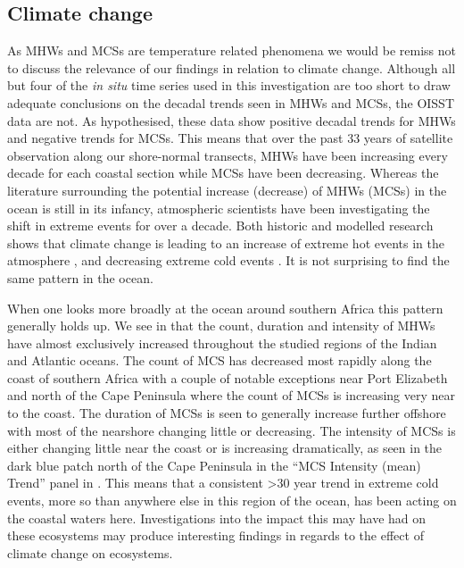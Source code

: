 \documentclass[a4paper,10pt,review]{elsarticle}
\begin{document}
\subsection{Climate change}
As MHWs and MCSs are temperature related phenomena we would be remiss not to discuss the relevance of our findings in relation to climate change. Although all but four of the \emph{in situ} time series used in this investigation are too short to draw adequate conclusions on the decadal trends seen in MHWs and MCSs, the OISST data are not. As hypothesised, these data show positive decadal trends for MHWs and negative trends for MCSs. This means that over the past 33 years of satellite observation along our shore-normal transects, MHWs have been increasing every decade for each coastal section while MCSs have been decreasing. Whereas the literature surrounding the potential increase (decrease) of MHWs (MCSs) in the ocean is still in its infancy, atmospheric scientists have been investigating the shift in extreme events for over a decade. Both historic and modelled research shows that climate change is leading to an increase of extreme hot events in the atmosphere \citep{Easterling2000, Perkins2013}, and decreasing extreme cold events \citep{Meehl2004}. It is not surprising to find the same pattern in the ocean.

When one looks more broadly at the ocean around southern Africa this pattern generally holds up. We see in  that the count, duration and intensity of MHWs have almost exclusively increased throughout the studied regions of the Indian and Atlantic oceans. The count of MCS has decreased most rapidly along the coast of southern Africa with a couple of notable exceptions near Port Elizabeth and north of the Cape Peninsula where the count of MCSs is increasing very near to the coast. The duration of MCSs is seen to generally increase further offshore with most of the nearshore changing little or decreasing. The intensity of MCSs is either changing little near the coast or is increasing dramatically, as seen in the dark blue patch north of the Cape Peninsula in the ``MCS Intensity (mean) Trend'' panel in . This means that a consistent >30 year trend in extreme cold events, more so than anywhere else in this region of the ocean, has been acting on the coastal waters here. Investigations into the impact this may have had on these ecosystems may produce interesting findings in regards to the effect of climate change on ecosystems.
\end{document}
